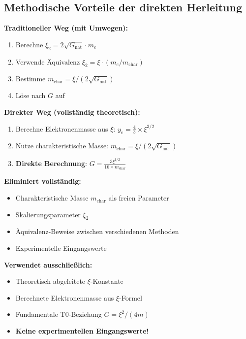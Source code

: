 \documentclass[12pt,a4paper]{article}
\theoremstyle{definition}
\begin{document}
\subsection{Methodische Vorteile der direkten Herleitung}

\textbf{Traditioneller Weg (mit Umwegen):}
\begin{enumerate}
	\item Berechne $\xi_2 = 2\sqrt{G_{\text{nat}}} \cdot m_e$
	\item Verwende Äquivalenz $\xi_2 = \xi \cdot (m_e/m_{\text{char}})$
	\item Bestimme $m_{\text{char}} = \xi/(2\sqrt{G_{\text{nat}}})$
	\item Löse nach $G$ auf
\end{enumerate}

\textbf{Direkter Weg (vollständig theoretisch):}
\begin{enumerate}
	\item Berechne Elektronenmasse aus $\xi$: $y_e = \frac{4}{3} \times \xi^{3/2}$
	\item Nutze charakteristische Masse: $m_{\text{char}} = \xi/(2\sqrt{G_{\text{nat}}})$
	\item \textbf{Direkte Berechnung}: $G = \frac{3\xi^{1/2}}{16 \times m_{\text{char}}}$
\end{enumerate}

\begin{revolutionary}
	\textbf{Eliminiert vollständig:}
	\begin{itemize}
		\item Charakteristische Masse $m_{\text{char}}$ als freien Parameter
		\item Skalierungsparameter $\xi_2$
		\item Äquivalenz-Beweise zwischen verschiedenen Methoden
		\item Experimentelle Eingangswerte
	\end{itemize}
	
	\textbf{Verwendet ausschließlich:}
	\begin{itemize}
		\item Theoretisch abgeleitete $\xi$-Konstante
		\item Berechnete Elektronenmasse aus $\xi$-Formel
		\item Fundamentale T0-Beziehung $G = \xi^2/(4m)$
		\item \textbf{Keine experimentellen Eingangswerte!}
	\end{itemize}
\end{revolutionary}
\end{document}
